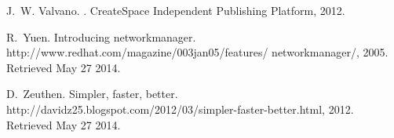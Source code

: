 \documentclass{acm_proc_article-sp}
\begin{document}
\begin{thebibliography}{10}
J.~W. Valvano.
.
\newblock CreateSpace Independent Publishing Platform, 2012.

R.~Yuen.
\newblock Introducing networkmanager.
\newblock http://www.redhat.com/magazine/003jan05/features/ networkmanager/,
  2005.
\newblock Retrieved May 27 2014.

D.~Zeuthen.
\newblock Simpler, faster, better.
\newblock http://davidz25.blogspot.com/2012/03/simpler-faster-better.html,
  2012.
\newblock Retrieved May 27 2014.

\end{thebibliography}

\balancecolumns
\end{document}
